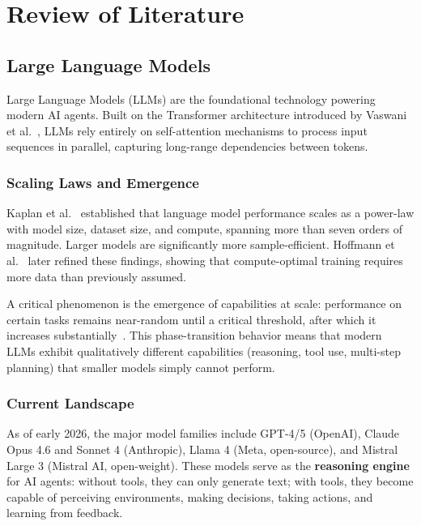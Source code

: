 \documentclass[12pt,a4paper]{report}
\begin{document}
\chapter{Review of Literature}

\section{Large Language Models}

Large Language Models (LLMs) are the foundational technology powering modern AI agents. Built on the Transformer architecture introduced by Vaswani et al.~\cite{vaswani2017attention}, LLMs rely entirely on self-attention mechanisms to process input sequences in parallel, capturing long-range dependencies between tokens.

\subsection{Scaling Laws and Emergence}

Kaplan et al.~\cite{kaplan2020scaling} established that language model performance scales as a power-law with model size, dataset size, and compute, spanning more than seven orders of magnitude. Larger models are significantly more sample-efficient. Hoffmann et al.~\cite{hoffmann2022chinchilla} later refined these findings, showing that compute-optimal training requires more data than previously assumed.

A critical phenomenon is the emergence of capabilities at scale: performance on certain tasks remains near-random until a critical threshold, after which it increases substantially~\cite{wei2022emergent}. This phase-transition behavior means that modern LLMs exhibit qualitatively different capabilities (reasoning, tool use, multi-step planning) that smaller models simply cannot perform.

\subsection{Current Landscape}

As of early 2026, the major model families include GPT-4/5 (OpenAI), Claude Opus 4.6 and Sonnet 4 (Anthropic), Llama 4 (Meta, open-source), and Mistral Large 3 (Mistral AI, open-weight). These models serve as the \textbf{reasoning engine} for AI agents: without tools, they can only generate text; with tools, they become capable of perceiving environments, making decisions, taking actions, and learning from feedback.
\end{document}
